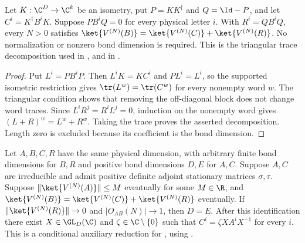 \begin{lemma}
    \label{thm:spc_aux_supported_periodic_split}
    \leanok
    Let $K:\C^D\to\C^k$ be an isometry, put $P=KK^\dagger$ and
    $Q=\Id-P$, and let $C^i=K^\dagger B^iK$.
    Suppose $PB^iQ=0$ for every physical letter $i$.
    With $R^i=QB^iQ$, every $N>0$ satisfies
    $\ket{V^{(N)}(B)}=\ket{V^{(N)}(C)}+\ket{V^{(N)}(R)}$.
    No normalization or nonzero bond dimension is required.
    This is the triangular trace decomposition used in
    \cite[proof of Theorem~TIcanonical, lines~785--815]{PerezGarcia2007Matrix},
    and in \cite[Appendix~C, lines~2653--2717]{Schuch2011Phases}.
\end{lemma}

\begin{proof}\leanok
    Put $L^i=PB^iP$. Then $L^iK=KC^i$ and $PL^i=L^i$,
    so the supported isometric restriction gives
    $\tr(L^w)=\tr(C^w)$ for every nonempty word $w$.
    The triangular condition shows that removing the off-diagonal block
    does not change word traces. Since $L^iR^j=R^iL^j=0$, induction on
    the nonempty word gives $(L+R)^w=L^w+R^w$.
    Taking the trace proves the asserted decomposition.
    Length zero is excluded because its coefficient is the bond dimension.
\end{proof}

\begin{lemma}
    \label{thm:spc_aux_retained_dimension_gauge}
    \leanok
    Let $A,B,C,R$ have the same physical dimension, with arbitrary finite
    bond dimensions for $B,R$ and positive bond dimensions $D,E$ for $A,C$.
    Suppose $A,C$ are irreducible and admit positive definite adjoint
    stationary matrices $\sigma,\tau$.
    Suppose $\|\ket{V^{(N)}(A)}\|\leq M$ eventually for some $M\in\R$,
    and $\ket{V^{(N)}(B)}=\ket{V^{(N)}(C)}+\ket{V^{(N)}(R)}$ eventually.
    If $\|\ket{V^{(N)}(R)}\|\to0$ and $|O_{AB}(N)|\to1$, then $D=E$.
    After this identification there exist $X\in\GL_D(\C)$ and
    $\zeta\in\C\setminus\{0\}$ such that
    $C^i=\zeta XA^iX^{-1}$ for every $i$.
    This is a conditional auxiliary reduction for
    \cite[Appendix~C, lines~2653--2717]{Schuch2011Phases}, using
    \cite[Lemma~equalMPS]{Cirac2016MPDO_arXiv}.
\end{lemma}

